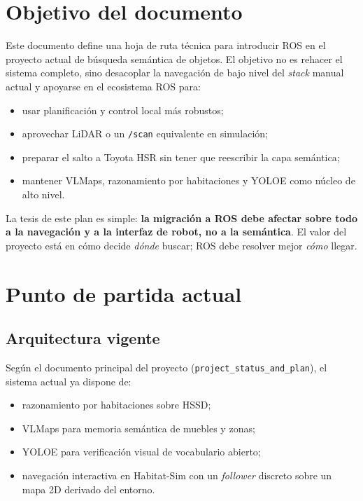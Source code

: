\documentclass[11pt,a4paper]{article}
\begin{document}
\section{Objetivo del documento}

Este documento define una hoja de ruta técnica para introducir ROS en el
proyecto actual de búsqueda semántica de objetos. El objetivo no es rehacer el
sistema completo, sino desacoplar la navegación de bajo nivel del \textit{stack}
manual actual y apoyarse en el ecosistema ROS para:

\begin{itemize}
  \item usar planificación y control local más robustos;
  \item aprovechar LiDAR o un \texttt{/scan} equivalente en simulación;
  \item preparar el salto a Toyota HSR sin tener que reescribir la capa
        semántica;
  \item mantener VLMaps, razonamiento por habitaciones y YOLOE como núcleo de
        alto nivel.
\end{itemize}

La tesis de este plan es simple: \textbf{la migración a ROS debe afectar sobre
todo a la navegación y a la interfaz de robot, no a la semántica}. El valor
del proyecto está en cómo decide \emph{dónde} buscar; ROS debe resolver mejor
\emph{cómo} llegar.

\section{Punto de partida actual}

\subsection{Arquitectura vigente}

Según el documento principal del proyecto (\texttt{project\_status\_and\_plan}),
el sistema actual ya dispone de:

\begin{itemize}
  \item razonamiento por habitaciones sobre HSSD;
  \item VLMaps para memoria semántica de muebles y zonas;
  \item YOLOE para verificación visual de vocabulario abierto;
  \item navegación interactiva en Habitat-Sim con un \textit{follower} discreto
        sobre un mapa 2D derivado del entorno.
\end{itemize}
\end{document}
